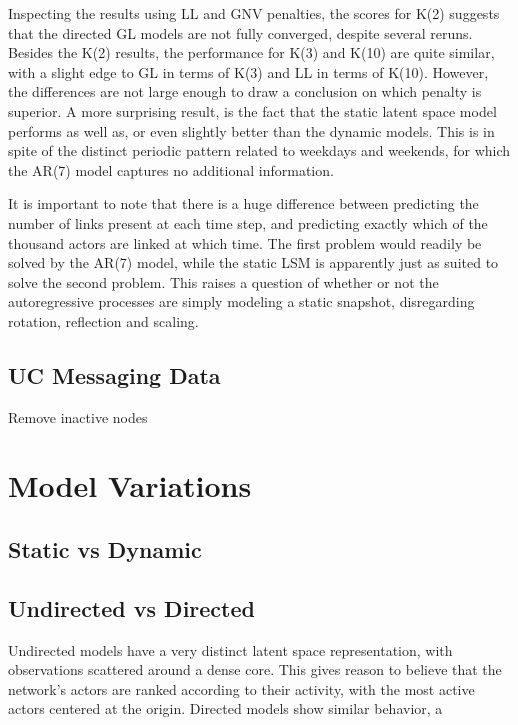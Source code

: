         Inspecting the results using LL and GNV penalties, the scores for K(2) suggests that the directed GL models are not fully converged, despite several reruns. Besides the K(2) results, the performance for K(3) and K(10) are quite similar, with a slight edge to GL in terms of K(3) and LL in terms of K(10). However, the differences are not large enough to draw a conclusion on which penalty is superior. A more surprising result, is the fact that the static latent space model performs as well as, or even slightly better than the dynamic models. This is in spite of the distinct periodic pattern related to weekdays and weekends, for which the AR(7) model captures no additional information. 
        
        It is important to note that there is a huge difference between predicting the number of links present at each time step, and predicting exactly which of the thousand actors are linked at which time. The first problem would readily be solved by the AR(7) model, while the static LSM is apparently just as suited to solve the second problem. This raises a question of whether or not the autoregressive processes are simply modeling a static snapshot, disregarding rotation, reflection and scaling.
        
    \subsection{UC Messaging Data}
    
        Remove inactive nodes
    
\section{Model Variations}

    \subsection{Static vs Dynamic}

    \subsection{Undirected vs Directed}
    
        Undirected models have a very distinct latent space representation, with observations scattered around a dense core. This gives reason to believe that the network's actors are ranked according to their activity, with the most active actors centered at the origin. 
        Directed models show similar behavior, a
    
